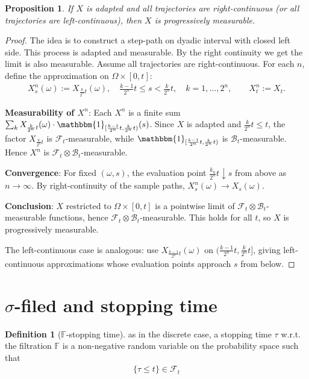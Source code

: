 \documentclass[a4paper,11pt]{book}
\newtheorem{proposition}[theorem]{Proposition}
\theoremstyle{definition}
\newtheorem{definition}{Definition}[section]
\theoremstyle{remark}
\begin{document}
\begin{proposition}
	If $X$ is adapted and all trajectories are right-continuous (or all trajectories are left-continuous), then $X$ is progressively measurable.
\end{proposition}
\begin{proof}
	The idea is to construct a step-path on dyadic interval with closed left side. 
	This process is adapted and measurable. By the right continuity we get the limit is also measurable. 
	Assume all trajectories are right-continuous. For each $n$, define the approximation on $\Omega \times [0, t]$:
	\begin{align*}
		X_s^n(\omega) := X_{\frac{k}{2^n}t}(\omega), \quad \frac{k-1}{2^n}t \le s < \frac{k}{2^n}t, \quad k = 1, \dots, 2^n, \qquad X_t^n := X_t.
	\end{align*}
	
	\textbf{Measurability of $X^n$}: Each $X^n$ is a finite sum $\sum_k X_{\frac{k}{2^n}t}(\omega) \cdot \mathbbm{1}_{[\frac{k-1}{2^n}t, \frac{k}{2^n}t)}(s)$. Since $X$ is adapted and $\frac{k}{2^n}t \le t$, the factor $X_{\frac{k}{2^n}t}$ is $\mathcal{F}_t$-measurable, while $\mathbbm{1}_{[\frac{k-1}{2^n}t, \frac{k}{2^n}t)}$ is $\mathcal{B}_t$-measurable. Hence $X^n$ is $\mathcal{F}_t \otimes \mathcal{B}_t$-measurable.

	\textbf{Convergence}: For fixed $(\omega, s)$, the evaluation point $\frac{k_n}{2^n}t \downarrow s$ from above as $n \to \infty$. By right-continuity of the sample paths, $X^n_s(\omega) \to X_s(\omega)$.

	\textbf{Conclusion}: $X$ restricted to $\Omega \times [0,t]$ is a pointwise limit of $\mathcal{F}_t \otimes \mathcal{B}_t$-measurable functions, hence $\mathcal{F}_t \otimes \mathcal{B}_t$-measurable. This holds for all $t$, so $X$ is progressively measurable.

	The left-continuous case is analogous: use $X_{\frac{k-1}{2^n}t}(\omega)$ on $(\frac{k-1}{2^n}t, \frac{k}{2^n}t]$, giving left-continuous approximations whose evaluation points approach $s$ from below.
\end{proof}



\section{$\sigma$-filed and stopping time}
\begin{definition}[$\mathbb{F}$-stopping time]
	as in the discrete case, a stopping time $\tau$ w.r.t. the filtration $\mathbb{F}$ is a non-negative random variable on the probability space such that
	\begin{align*}
		\{ \tau \le t \} \in \mathcal{F}_t
	\end{align*}
\end{definition}
\end{document}
